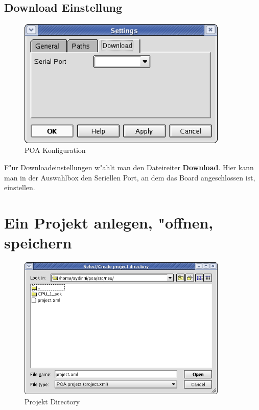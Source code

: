 \documentclass[a4paper,titlepage,12pt,ngerman]{scrbook}
\begin{document}
\subsection{Download Einstellung}
\begin{figure}[htbp]

\begin{center}

\includegraphics[width=10cm]{POAConfiguration3}

\caption{POA Konfiguration}\label{test}

\end{center}

\end{figure}
F"ur Downloadeinstellungen w"ahlt man den Dateireiter {\bf Download}. Hier kann man in der Auswahlbox den Seriellen Port, an dem das Board angeschlossen ist, einstellen.\par

\newpage
\section{Ein Projekt anlegen, "offnen, speichern}
\begin{figure}[htbp]

\begin{center}

\includegraphics[width=10cm]{Directory}

\caption{Projekt Directory}\label{test}

\end{center}

\end{figure}
\end{document}
